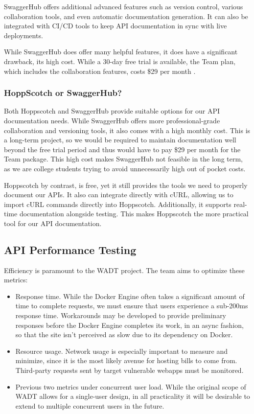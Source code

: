 \documentclass[12pt,titlepage]{article}
\begin{document}
SwaggerHub offers additional advanced features such as version control, various collaboration tools, and even automatic documentation generation. It can also be integrated with CI/CD tools to keep API documentation in sync with live deployments. 

While SwaggerHub does offer many helpful features, it does have a significant drawback, its high cost. While a 30-day free trial is available, the Team plan, which includes the collaboration features, costs \$29 per month \cite{swagger-pricing}.

\subsubsection{HoppScotch or SwaggerHub?}
Both Hoppscotch and SwaggerHub provide suitable options for our API documentation needs. While SwaggerHub offers more professional-grade collaboration and versioning tools, it also comes with a high monthly cost. This is a long-term project, so we would be required to maintain documentation well beyond the free trial period and thus would have to pay \$29 per month for the Team package. This high cost makes SwaggerHub not feasible in the long term, as we are college students trying to avoid unnecessarily high out of pocket costs.

Hoppscotch by contrast, is free, yet it still provides the tools we need to properly document our APIs. It also can integrate directly with cURL, allowing us to import cURL commands directly into Hoppscotch. Additionally, it supports real-time documentation alongside testing. This makes Hoppscotch the more practical tool for our API documentation.

\subsection{API Performance Testing}
Efficiency is paramount to the WADT project. The team aims to optimize these metrics:
\begin{itemize}
	\item Response time. While the Docker Engine often takes a significant amount of time to complete requests, we must ensure that users experience a sub-200ms response time. Workarounds may be developed to provide preliminary responses before the Docker Engine completes its work, in an async fashion, so that the site isn't perceived as slow due to its dependency on Docker.
	\item Resource usage. Network usage is especially important to measure and minimize, since it is the most likely avenue for hosting bills to come from. Third-party requests sent by target vulnerable webapps must be monitored.
	\item Previous two metrics under concurrent user load. While the original scope of WADT allows for a single-user design, in all practicality it will be desirable to extend to multiple concurrent users in the future.
\end{itemize}
\end{document}
